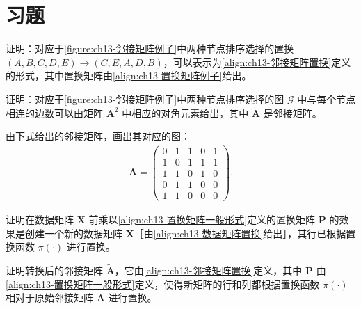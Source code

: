 \documentclass[../../main.tex]{subfiles}
\begin{document}
\section{习题}\label{section:ch13-习题}

\begin{exercise}[$\star$]\label{exercise:ch13-01}
证明：对应于\cref{figure:ch13-邻接矩阵例子}中两种节点排序选择的置换 $(A,B,C,D,E)\rightarrow(C,E,A,D,B)$，可以表示为\eqref{align:ch13-邻接矩阵置换}定义的形式，其中置换矩阵由\eqref{align:ch13-置换矩阵例子}给出。
\end{exercise}

\begin{exercise}[$\star\star$]\label{exercise:ch13-02}
证明：对应于\cref{figure:ch13-邻接矩阵例子}中两种节点排序选择的图 $\mathcal{G}$ 中与每个节点相连的边数可以由矩阵 $\bm{A}^2$ 中相应的对角元素给出，其中 $\bm{A}$ 是邻接矩阵。
\end{exercise}

\begin{exercise}[$\star$]\label{exercise:ch13-03}
由下式给出的邻接矩阵，画出其对应的图：
\begin{align}
\bm{A}=\begin{pmatrix}0&1&1&0&1\\1&0&1&1&1\\1&1&0&1&0\\0&1&1&0&0\\1&1&0&0&0\end{pmatrix}.
\label{align:ch13-习题邻接矩阵}
\end{align}
\end{exercise}

\begin{exercise}[$\star\star$]\label{exercise:ch13-04}
证明在数据矩阵 $\bm{X}$ 前乘以\eqref{align:ch13-置换矩阵一般形式}定义的置换矩阵 $\bm{P}$ 的效果是创建一个新的数据矩阵 $\widetilde{\bm{X}}$［由\eqref{align:ch13-数据矩阵置换}给出］，其行已根据置换函数 $\pi(\cdot)$ 进行置换。
\end{exercise}

\begin{exercise}[$\star\star$]\label{exercise:ch13-05}
证明转换后的邻接矩阵 $\widetilde{\bm{A}}$，它由\eqref{align:ch13-邻接矩阵置换}定义，其中 $\bm{P}$ 由\eqref{align:ch13-置换矩阵一般形式}定义，使得新矩阵的行和列都根据置换函数 $\pi(\cdot)$ 相对于原始邻接矩阵 $\bm{A}$ 进行置换。
\end{exercise}
\end{document}
